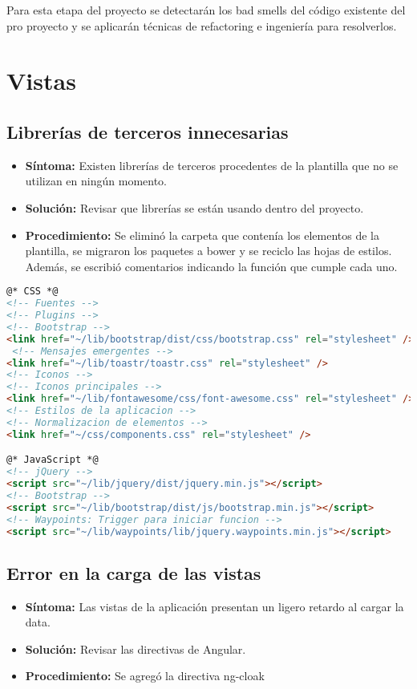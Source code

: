 Para esta etapa del proyecto se detectarán los bad smells del código existente del pro proyecto y se aplicarán técnicas de refactoring e ingeniería para resolverlos.

\section{Vistas}
\subsection{Librerías de terceros innecesarias}
\begin{itemize}
	\item \textbf{Síntoma:} Existen librerías de terceros procedentes de la plantilla que no se utilizan en ningún momento.
	\item \textbf{Solución:} Revisar que librerías se están usando dentro del proyecto. 
	\item \textbf{Procedimiento:} Se eliminó la carpeta que contenía los elementos de la plantilla, se migraron los paquetes a bower y se reciclo las hojas de estilos. Además, se escribió comentarios indicando la función que cumple cada uno.
\end{itemize}

\begin{lstlisting}[language=html]
@* CSS *@
<!-- Fuentes -->
<!-- Plugins -->
<!-- Bootstrap -->
<link href="~/lib/bootstrap/dist/css/bootstrap.css" rel="stylesheet" /> 
 <!-- Mensajes emergentes -->
<link href="~/lib/toastr/toastr.css" rel="stylesheet" />
<!-- Iconos -->
<!-- Iconos principales -->
<link href="~/lib/fontawesome/css/font-awesome.css" rel="stylesheet" /> 
<!-- Estilos de la aplicacion -->
<!-- Normalizacion de elementos -->
<link href="~/css/components.css" rel="stylesheet" /> 

@* JavaScript *@
<!-- jQuery -->
<script src="~/lib/jquery/dist/jquery.min.js"></script> 
<!-- Bootstrap -->
<script src="~/lib/bootstrap/dist/js/bootstrap.min.js"></script> 
<!-- Waypoints: Trigger para iniciar funcion -->
<script src="~/lib/waypoints/lib/jquery.waypoints.min.js"></script> 
\end{lstlisting}

\subsection{Error en la carga de las vistas}
\begin{itemize}
	\item \textbf{Síntoma:} Las vistas de la aplicación presentan un ligero retardo al cargar la data.
	\item \textbf{Solución:} Revisar las directivas de Angular. 
	\item \textbf{Procedimiento:} Se agregó la directiva ng-cloak
\end{itemize}

